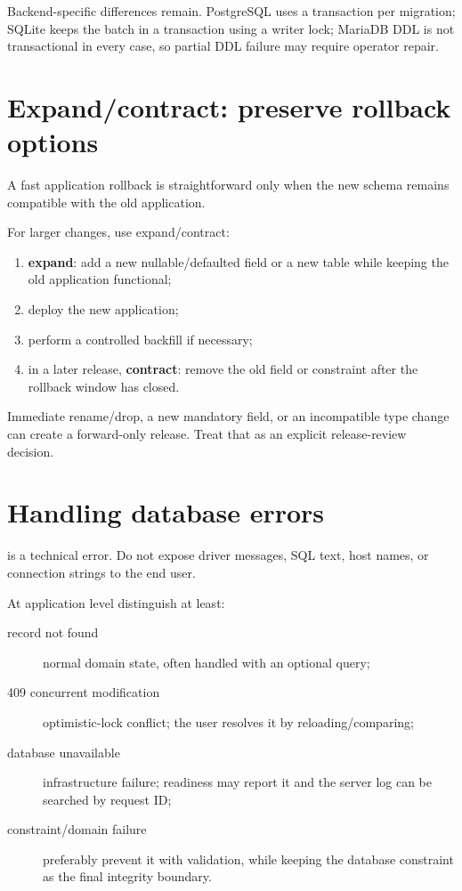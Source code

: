 Backend-specific differences remain. PostgreSQL uses a transaction per migration; SQLite keeps the batch in a transaction using a  writer lock; MariaDB DDL is not transactional in every case, so partial DDL failure may require operator repair.

\section{Expand/contract: preserve rollback options}

A fast application rollback is straightforward only when the new schema remains compatible with the old application.

For larger changes, use expand/contract:

\begin{enumerate}
\item \textbf{expand}: add a new nullable/defaulted field or a new table while keeping the old application functional;
\item deploy the new application;
\item perform a controlled backfill if necessary;
\item in a later release, \textbf{contract}: remove the old field or constraint after the rollback window has closed.
\end{enumerate}

Immediate rename/drop, a new mandatory field, or an incompatible type change can create a forward-only release. Treat that as an explicit release-review decision.

\section{Handling database errors}

 is a technical error. Do not expose driver messages, SQL text, host names, or connection strings to the end user.

At application level distinguish at least:

\begin{description}
\item[record not found] normal domain state, often handled with an optional query;
\item[409 concurrent modification] optimistic-lock conflict; the user resolves it by reloading/comparing;
\item[database unavailable] infrastructure failure; readiness may report it and the server log can be searched by request ID;
\item[constraint/domain failure] preferably prevent it with validation, while keeping the database constraint as the final integrity boundary.
\end{description}

